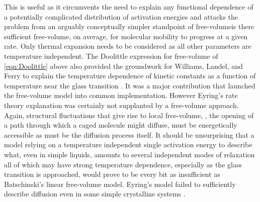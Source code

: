 This is useful as it circumvents the need to explain any functional dependence of a potentially complicated distribution of activation energies and attacks the problem from an arguably conceptually simpler standpoint of free-volume\textemdash is there sufficient free-volume, on average, for molecular mobility to progress at a given rate.  Only thermal expansion needs to be considered as all other parameters are temperature independent. The Doolittle expression for free-volume of \eqn\nolinebreak \ref{eqn:Doolittle} above also provided the groundwork for Williams, Landel, and Ferry to explain the temperature dependence of kinetic constants as a function  of temperature near the glass transition \nolinebreak\cite{Williams2}.  It was a major contribution that launched the free-volume model into common implementation.  However Eyring's rate theory explanation was certainly not supplanted by a free-volume approach.  Again, structural fluctuations that give rise to local free-volume, \ie, the opening of a path through which a caged molecule might diffuse, must be energetically accessible as must be the diffusion process itself.  It should be unsurprising that a model relying on a temperature independent single activation energy to describe what, even in simple liquids, amounts to several independent modes of relaxation all of which may have strong temperature dependence, especially as the glass transition is approached, would prove to be every bit as insufficient as Batschinski's linear free-volume model.  Eyring's model failed to sufficiently describe diffusion even in some simple crystalline systems \nolinebreak\cite{Zener}.  

